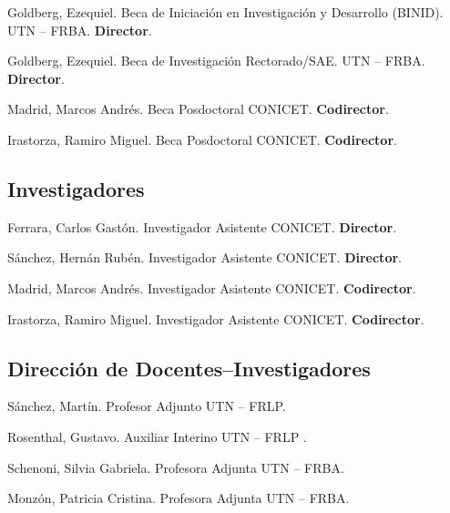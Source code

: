      Goldberg, Ezequiel. Beca de Iniciación en Investigación y Desarrollo (BINID). UTN -- FRBA. \textbf{Director}.

     Goldberg, Ezequiel. Beca de Investigación Rectorado/SAE. UTN -- FRBA. \textbf{Director}.

     Madrid, Marcos Andrés. Beca Posdoctoral CONICET. \textbf{Codirector}.

     Irastorza, Ramiro Miguel. Beca Posdoctoral CONICET. \textbf{Codirector}.

\subsection{Investigadores}
 Ferrara, Carlos Gastón. Investigador Asistente CONICET. \textbf{Director}.

 Sánchez, Hernán Rubén. Investigador Asistente CONICET. \textbf{Director}.

     Madrid, Marcos Andrés. Investigador Asistente CONICET. \textbf{Codirector}.

     Irastorza, Ramiro Miguel. Investigador Asistente CONICET. \textbf{Codirector}.
  
\subsection{Dirección de Docentes--Investigadores}
   Sánchez, Martín. Profesor Adjunto UTN -- FRLP.
  
   Rosenthal, Gustavo. Auxiliar Interino UTN -- FRLP .
  
   Schenoni, Silvia Gabriela. Profesora Adjunta UTN -- FRBA.
  
   Monzón, Patricia Cristina. Profesora Adjunta UTN -- FRBA.
  

